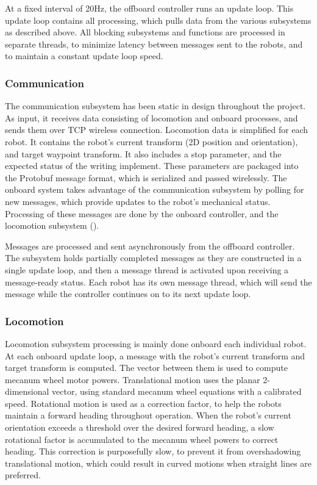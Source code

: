 At a fixed interval of 20Hz, the offboard controller runs an update loop. This update loop contains all processing, which pulls data from the various subsystems as described above. All blocking subsystems and functions are processed in separate threads, to minimize latency between messages sent to the robots, and to maintain a constant update loop speed.

\subsubsection{Communication}
\label{sec:sw_comm}
The communication subsystem has been static in design throughout the project. As input, it receives data consisting of locomotion and onboard processes, and sends them over TCP wireless connection. Locomotion data is simplified for each robot. It contains the robot's current transform (2D position and orientation), and target waypoint transform. It also includes a stop parameter, and the expected status of the writing implement. These parameters are packaged into the Protobuf message format, which is serialized and passed wirelessly. The onboard system takes advantage of the communication subsystem by polling for new messages, which provide updates to the robot's mechanical status. Processing of these messages are done by the onboard controller, and the locomotion subsystem ().

Messages are processed and sent asynchronously from the offboard controller. The subsystem holds partially completed messages as they are constructed in a single update loop, and then a message thread is activated upon receiving a message-ready status. Each robot has its own message thread, which will send the message while the controller continues on to its next update loop.

\subsubsection{Locomotion}
\label{sec:sw_locomotion}
Locomotion subsystem processing is mainly done onboard each individual robot. At each onboard update loop, a message with the robot's current transform and target transform is computed. The vector between them is used to compute mecanum wheel motor powers. Translational motion uses the planar 2-dimensional vector, using standard mecanum wheel equations with a calibrated speed. Rotational motion is used as a correction factor, to help the robots maintain a forward heading throughout operation. When the robot's current orientation exceeds a threshold over the desired forward heading, a slow rotational factor is accumulated to the mecanum wheel powers to correct heading. This correction is purposefully slow, to prevent it from overshadowing translational motion, which could result in curved motions when straight lines are preferred.

